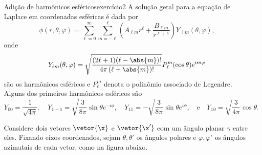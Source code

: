\begin{exercício}{Adição de harmônicos esféricos}{exercício2}
    A solução geral para a equação de Laplace em coordenadas esféricas é dada por
    \begin{equation*}
        \phi(r, \theta, \varphi) = \sum_{\ell = 0}^\infty \sum_{m = -\ell}^\ell \left(A_{\ell m}r^\ell + \frac{B_{\ell m}}{r^{\ell + 1}}\right) Y_{\ell m}(\theta, \varphi),
    \end{equation*}
    onde
    \begin{equation*}
        Y_{\ell m}(\theta, \varphi) = \sqrt{\frac{(2\ell + 1)(\ell - \abs{m})!}{4\pi \left(\ell + \abs{m}\right)!}} P_\ell^m(\cos\theta)e^{im\varphi}
    \end{equation*}
    são os harmônicos esféricos e \(P_\ell^m\) denota o polinômio associado de Legendre. Alguns dos primeiros harmônicos esféricos são
    \begin{equation*}
        Y_{00} = \frac{1}{\sqrt{4\pi}},\quad
        Y_{1-1} = \sqrt{\frac{3}{8\pi}}\sin\theta e^{-i\phi},\quad
        Y_{11} = -\sqrt{\frac{3}{8\pi}}\sin\theta e^{i\phi},\quad\text{e}\quad
        Y_{10} = \sqrt{\frac{3}{4\pi}} \cos\theta.
    \end{equation*}

    Considere dois vetores \(\vetor{\x}\) e \(\vetor{\x'}\) com um ângulo planar \(\gamma\) entre eles. Fixando eixos coordenados, sejam \(\theta, \theta'\) os ângulos polares e \(\varphi, \varphi'\) os ângulos azimutais de cada vetor, como na figura abaixo.
    \begin{center}

\end{center}
\end{exercício}

